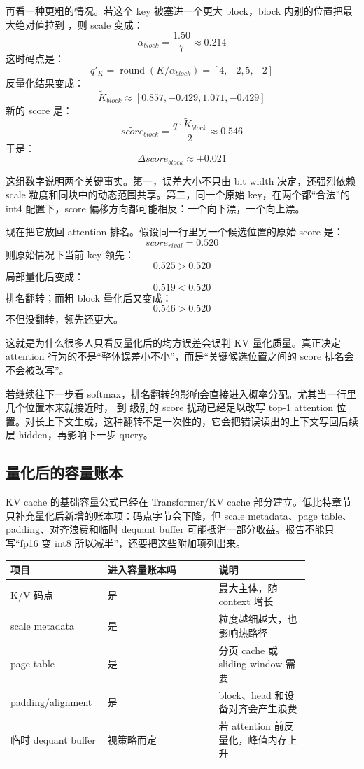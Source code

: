 再看一种更粗的情况。若这个 key 被塞进一个更大 block，block 内别的位置把最大绝对值拉到 ，则 scale 变成：
\[
\alpha_{block}=\frac{1.50}{7}\approx 0.214
\]
这时码点是：
\[
q'_K=\operatorname{round}(K/\alpha_{block})=[4,-2,5,-2]
\]
反量化结果变成：
\[
\tilde{K}_{block}
\approx
[0.857,-0.429,1.071,-0.429]
\]
新的 score 是：
\[
\tilde{score}_{block}
=
\frac{q\cdot \tilde{K}_{block}}{2}
\approx 0.546
\]
于是：
\[
\Delta score_{block}\approx +0.021
\]

这组数字说明两个关键事实。第一，误差大小不只由 bit width 决定，还强烈依赖 scale 粒度和同块中的动态范围共享。第二，同一个原始 key，在两个都“合法”的 int4 配置下，score 偏移方向都可能相反：一个向下漂，一个向上漂。

现在把它放回 attention 排名。假设同一行里另一个候选位置的原始 score 是：
\[
score_{rival}=0.520
\]
则原始情况下当前 key 领先：
\[
0.525 > 0.520
\]
局部量化后变成：
\[
0.519 < 0.520
\]
排名翻转；而粗 block 量化后又变成：
\[
0.546 > 0.520
\]
不但没翻转，领先还更大。

\begin{warningbox}
这就是为什么很多人只看反量化后的均方误差会误判 KV 量化质量。真正决定 attention 行为的不是“整体误差小不小”，而是“关键候选位置之间的 score 排名会不会被改写”。
\end{warningbox}

若继续往下一步看 softmax，排名翻转的影响会直接进入概率分配。尤其当一行里几个位置本来就接近时， 到  级别的 score 扰动已经足以改写 top-1 attention 位置。对长上下文生成，这种翻转不是一次性的，它会把错误读出的上下文写回后续层 hidden，再影响下一步 query。

\subsection{量化后的容量账本}

KV cache 的基础容量公式已经在 Transformer/KV cache 部分建立。低比特章节只补充量化后新增的账本项：码点字节会下降，但 scale metadata、page table、padding、对齐浪费和临时 dequant buffer 可能抵消一部分收益。报告不能只写“fp16 变 int8 所以减半”，还要把这些附加项列出来。

\begin{center}
\begin{tabular}{p{0.22\linewidth}p{0.34\linewidth}p{0.29\linewidth}}
\toprule
项目 & 进入容量账本吗 & 说明 \\
\midrule
K/V 码点 & 是 & 最大主体，随 context 增长 \\
scale metadata & 是 & 粒度越细越大，也影响热路径 \\
page table & 是 & 分页 cache 或 sliding window 需要 \\
padding/alignment & 是 & block、head 和设备对齐会产生浪费 \\
临时 dequant buffer & 视策略而定 & 若 attention 前反量化，峰值内存上升 \\
\bottomrule
\end{tabular}
\end{center}

